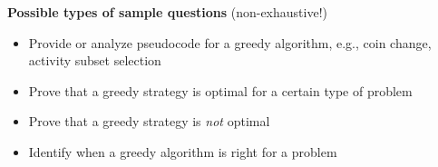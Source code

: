 \documentclass[11  pt]{exam}
\begin{document}
	\textbf{Possible types of sample questions} (non-exhaustive!)
	\begin{itemize}
		\item Provide or analyze pseudocode for a greedy algorithm, e.g., coin change, activity subset selection
		\item Prove that a greedy strategy is optimal for a certain type of problem
		\item Prove that a greedy strategy is \emph{not} optimal
		\item Identify when a greedy algorithm is right for a problem
	\end{itemize}
	
	
	
\end{document}
